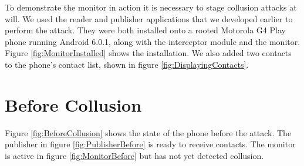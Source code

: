 To demonstrate the monitor in action it is necessary to stage collusion attacks at will.  We used the reader and publisher applications that we developed earlier to perform the attack.  They were both installed onto a rooted Motorola G4 Play phone running Android 6.0.1, along with the interceptor module and the monitor.  Figure \ref{fig:MonitorInstalled} shows the installation.  We also added two contacts to the phone's contact list, shown in figure \ref{fig:DisplayingContacts}.

\section{Before Collusion}

Figure \ref{fig:BeforeCollusion} shows the state of the phone before the attack.  The publisher in figure \ref{fig:PublisherBefore} is ready to receive contacts.  The monitor is active in figure \ref{fig:MonitorBefore} but has not yet detected collusion.\\

